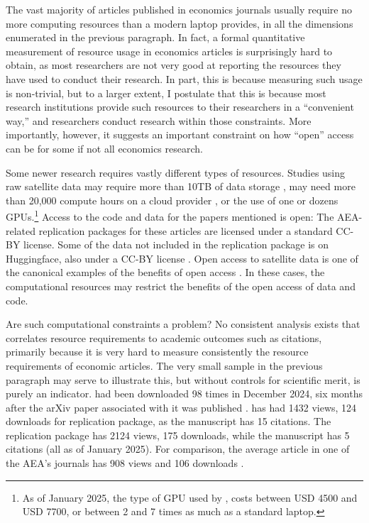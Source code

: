 \documentclass{Revue-economique}
\newcommand{\citep}{\parencite}
\newcommand{\citet}{\textcite}
\begin{document}
\begin{Article} [%
	Titre={Reproducibility and Open Science in Economics},
	Auteur={Lars Vilhuber\thanks{Cornell University, lars.vilhuber@cornell.edu}}]
\begin{refsection}[Main]
The vast majority of articles published in economics journals usually require no more computing resources than a modern laptop provides, in all the dimensions enumerated in the previous paragraph. In fact, a formal quantitative measurement of resource usage in economics articles is surprisingly hard to obtain, as most researchers are not very good at reporting the resources they have used to conduct their research. In part, this is because measuring such usage is non-trivial, but to a larger extent, I postulate that this is because most research institutions provide such resources to their researchers in a ``convenient way,'' and researchers conduct research within those constraints. More importantly, however, it suggests an important constraint on how ``open'' access can be for some if not all economics research.

Some newer research requires vastly different types of resources. Studies using raw satellite data may require more than 10TB of data storage \citep{khachiyan_using_2022,khachiyan_data_2022}, may need more than 20,000 compute hours on a cloud provider \citep{rudik_optimal_2020,rudik_data_2020}, or the use of one \citep{dell_deep_2024,dell_data_2025} or dozens \citep{khachiyan_data_2022} \acp{GPU}.\footnote{As of January 2025, the type of \ac{GPU} used by \citet{dell_data_2025}, costs between USD 4500 and USD 7700, or between 2 and 7 times as much as a standard laptop.} Access to the code and data for the papers mentioned is open: The AEA-related replication packages for these articles are licensed under a standard \ac{CC-BY} license. Some of the data not included in the \citet{dell_data_2025} replication package is on Huggingface, also under a \ac{CC-BY} license \citep{silcock_newswire_2024}. Open access to satellite data is one of the canonical examples of the benefits of open access \citep{nagaraj_improving_2020}. In these cases, the computational resources may restrict the benefits of the open access of data and code.

Are such computational constraints a problem? No consistent analysis exists that correlates resource requirements to academic outcomes such as citations, primarily because it is very hard to measure consistently the resource requirements of economic articles. The very small sample in the previous paragraph may serve to illustrate this, but without controls for scientific merit, is purely an indicator. \citet{silcock_newswire_2024} had been downloaded 98 times in December 2024, six months after the arXiv paper associated with it was published \citep{silcock_newswire_2024}. \citet{rudik_data_2020} has had  1432 views, 124 downloads for replication package, as the manuscript \citep{rudik_optimal_2020} has 15 citations. The replication package \citet{khachiyan_data_2022} has  2124 views, 175 downloads, while the manuscript \citep{khachiyan_using_2022} has 5 citations (all as of January 2025). For comparison, the average article in one of the \ac{AEA}'s journals has 908 views and 106 downloads \citep[Table 4]{vilhuber_report_2025}.


\end{refsection}
\end{Article}
\end{document}
